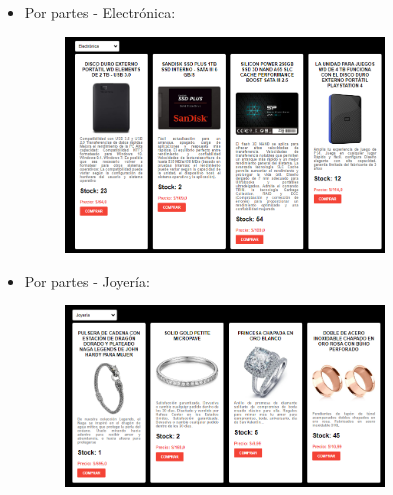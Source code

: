 \documentclass{article}
\begin{document}
\begin{itemize}
\begin{figure}[H]
	\end{figure}
\item Por partes - Electrónica:
\begin{figure}[H]
		\centering
		\includegraphics[width=0.8\textwidth,keepaspectratio]{Latex/img/electronica.png}
	\end{figure}

\item Por partes - Joyería:
\begin{figure}[H]
		\centering
		\includegraphics[width=0.8\textwidth,keepaspectratio]{Latex/img/joyeria.png}
	\end{figure}


\end{itemize}
\end{document}
